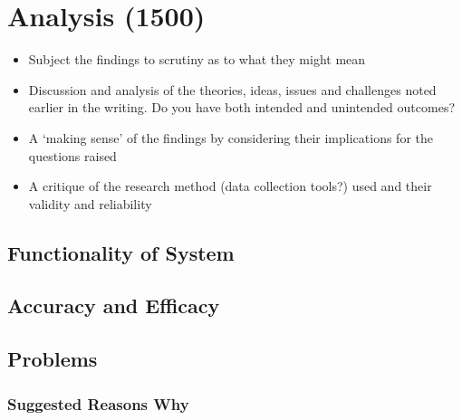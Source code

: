 \chapter{Analysis (1500)}
\begin{itemize}
	\item Subject the findings to scrutiny as to what they might mean
	\item Discussion and analysis of the theories, ideas, issues and challenges noted earlier in the writing. Do you have both intended and unintended outcomes?
	\item A `making sense' of the findings by considering their implications for the questions raised
	\item A critique of the research method (data collection tools?) used and their validity and reliability
\end{itemize}
\section{Functionality of System}
\section{Accuracy and Efficacy}
\section{Problems}
\subsection{Suggested Reasons Why}
